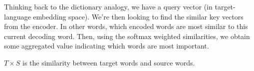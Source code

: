\documentclass[11pt]{article}
\begin{document}
\begin{minipage}[l]{.5\linewidth}
    \begin{figure}[H]
        \centering
    \end{figure}
\end{minipage}\hfill
\begin{minipage}[r]{.47\linewidth}
    Thinking back to the dictionary analogy, we have a query vector (in target-language embedding space). We're then looking to find the similar key vectors from the encoder. In other words, which encoded words are most similar to this current decoding word. Then, using the softmax weighted similarities, we obtain some aggregated value indicating which words are most important.

    $T\times S$ is the similarity between target words and source words.
\end{minipage}
\end{document}
